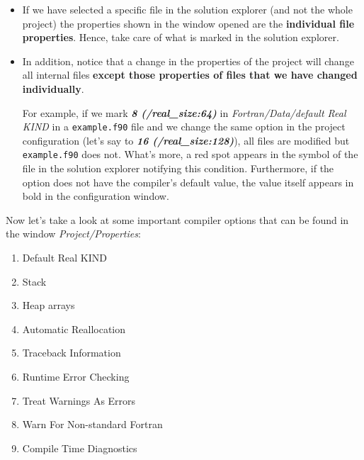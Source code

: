 \begin{IN}
    \begin{itemize}  
        \item If we have selected a specific file in the solution explorer (and not the whole project) the properties shown in the window opened are the \textbf{individual file properties}. Hence, take care of what is marked in the solution explorer.
        
        \item In addition, notice that a change in the properties of the project will change all internal files \textbf{except those properties of files that we have changed individually}. 
        
        For example, if we mark \textbf{\textit{8 (/real\_size:64)}} in \textit{Fortran/Data/default Real KIND} in a \texttt{example.f90} file and we change the same option in the project configuration (let's say to \textbf{\textit{16 (/real\_size:128)}}), all files are modified but \texttt{example.f90} does not. What's more, a red spot appears in the symbol of the file in the solution explorer notifying this condition. Furthermore, if the option does not have the compiler's default value, the value itself appears in bold in the configuration window.
    \end{itemize}
\end{IN}

Now let's take a look at some important compiler options that can be found in the window \textit{Project/Properties}:

\begin{enumerate}[nosep]
    \item Default Real KIND
    \item Stack
    \item Heap arrays
    \item Automatic Reallocation
    \item Traceback Information
    \item Runtime Error Checking
    \item Treat Warnings As Errors
    \item Warn For Non-standard Fortran
    \item Compile Time Diagnostics
\end{enumerate}



